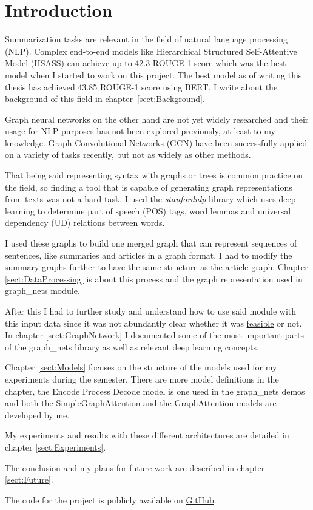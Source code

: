 \chapter*{Introduction}\label{sect:Introduction}

Summarization tasks are relevant in the field of natural language processing (NLP). Complex end-to-end models like Hierarchical Structured Self-Attentive Model (HSASS) \cite{HSSAS} can achieve up to 42.3 ROUGE-1 score which was the best model when I started to work on this project. The best model as of writing this thesis has achieved 43.85 ROUGE-1 score \cite{BERTsum} using BERT. I write about the background of this field in chapter~\ref{sect:Background}.

Graph neural networks on the other hand are not yet widely researched and their usage for NLP purposes has not been explored previously, at least to my knowledge. Graph Convolutional Networks (GCN) have been successfully applied on a variety of tasks recently, but not as widely as other methods.

That being said representing syntax with graphs or trees is common practice on the field, so finding a tool that is capable of generating graph representations from texts was not a hard task. I used the \textit{stanfordnlp} library which uses deep learning to determine part of speech (POS) tags, word lemmas and universal dependency (UD) relations between words.

I used these graphs to build one merged graph that can represent sequences of sentences, like summaries and articles in a graph format. I had to modify the summary graphs further to have the same structure as the article graph. Chapter \ref{sect:DataProcessing} is about this process and the graph representation used in graph\_nets module.

After this I had to further study and understand how to use said module with this input data since it was not abundantly clear whether it was \href{https://github.com/deepmind/graph\_nets/issues/36}{feasible} or not. In chapter \ref{sect:GraphNetwork} I documented some of the most important parts of the graph\_nets library as well as relevant deep learning concepts.

Chapter \ref{sect:Models} focuses on the structure of the models used for my experiments during the semester. There are more model definitions in the chapter, the Encode Process Decode model is one used in the graph\_nets demos and both the SimpleGraphAttention and the GraphAttention models are developed by me.

My experiments and results with these different architectures are detailed in chapter \ref{sect:Experiments}.

The conclusion and my plans for future work are described in chapter \ref{sect:Future}.

The code for the project is publicly available on \href{https://github.com/GKingA/graph\_transformations}{GitHub}.